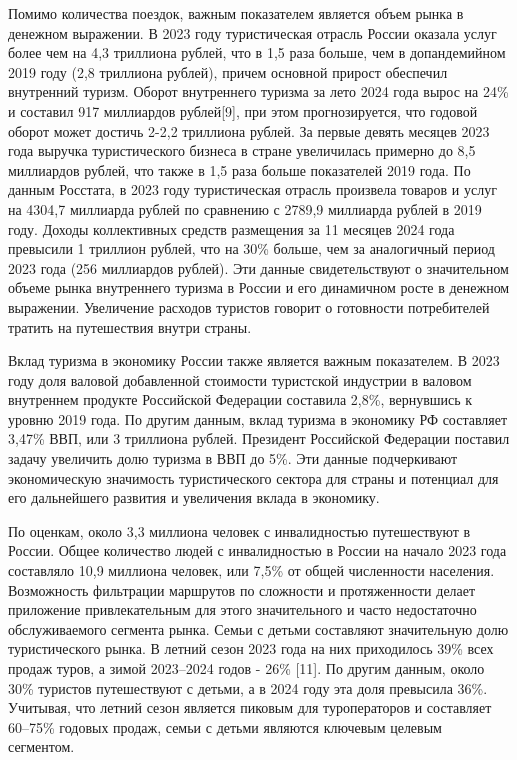 Помимо количества поездок, важным показателем является объем рынка в денежном выражении. В 2023 году туристическая отрасль России оказала услуг более чем на 4,3 триллиона рублей, что в 1,5 раза больше, чем в допандемийном 2019 году (2,8 триллиона рублей), причем основной прирост обеспечил внутренний туризм. Оборот внутреннего туризма за лето 2024 года вырос на 24\% и составил 917 миллиардов рублей[9], при этом прогнозируется, что годовой оборот может достичь 2-2,2 триллиона рублей. За первые девять месяцев 2023 года выручка туристического бизнеса в стране увеличилась примерно до 8,5 миллиардов рублей, что также в 1,5 раза больше показателей 2019 года. По данным Росстата, в 2023 году туристическая отрасль произвела товаров и услуг на 4304,7 миллиарда рублей по сравнению с 2789,9 миллиарда рублей в 2019 году. Доходы коллективных средств размещения за 11 месяцев 2024 года превысили 1 триллион рублей, что на 30\% больше, чем за аналогичный период 2023 года (256 миллиардов рублей). Эти данные свидетельствуют о значительном объеме рынка внутреннего туризма в России и его динамичном росте в денежном выражении. Увеличение расходов туристов говорит о готовности потребителей тратить на путешествия внутри страны.

Вклад туризма в экономику России также является важным показателем. В 2023 году доля валовой добавленной стоимости туристской индустрии в валовом внутреннем продукте Российской Федерации составила 2,8\%, вернувшись к уровню 2019 года. По другим данным, вклад туризма в экономику РФ составляет 3,47\% ВВП, или 3 триллиона рублей. Президент Российской Федерации поставил задачу увеличить долю туризма в ВВП до 5\%. Эти данные подчеркивают экономическую значимость туристического сектора для страны и потенциал для его дальнейшего развития и увеличения вклада в экономику.

По оценкам, около 3,3 миллиона человек с инвалидностью путешествуют в России. Общее количество людей с инвалидностью в России на начало 2023 года составляло 10,9 миллиона человек, или 7,5\% от общей численности населения. Возможность фильтрации маршрутов по сложности и протяженности делает приложение привлекательным для этого значительного и часто недостаточно обслуживаемого сегмента рынка.
Семьи с детьми составляют значительную долю туристического рынка. В летний сезон 2023 года на них приходилось 39\% всех продаж туров, а зимой 2023–2024 годов - 26\% [11]. По другим данным, около 30\% туристов путешествуют с детьми, а в 2024 году эта доля превысила 36\%. Учитывая, что летний сезон является пиковым для туроператоров и составляет 60–75\% годовых продаж, семьи с детьми являются ключевым целевым сегментом. 

